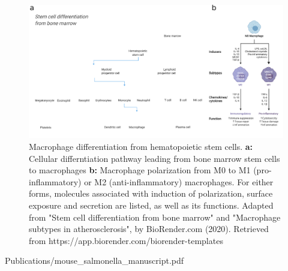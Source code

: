 \begin{figure}[htb]
    \includegraphics[width=\textwidth]{Parts/Part02/gfx/macrophage_differentiation.pdf}
    \caption[Macrophage differentiation.]{Macrophage differentiation from hematopoietic stem cells. \textbf{a:} Cellular differntiation pathway leading from bone marrow stem cells to macrophages \textbf{b:} Macrophage polarization from M0 to M1 (pro-inflammatory) or M2 (anti-inflammatory) macrophages. For either forms, molecules associated with induction of polarization, surface exposure and secretion are listed, as well as its functions.  Adapted from "Stem cell differentiation from bone marrow" and "Macrophage subtypes in atherosclerosis", by BioRender.com (2020). Retrieved from https://app.biorender.com/biorender-templates}
    \label{fig:02-03:macrophage}
\end{figure}



     {Publications/mouse_salmonella_manuscript.pdf}    
